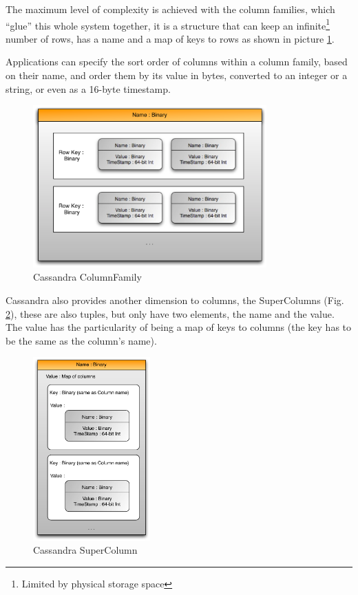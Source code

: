 The maximum level of complexity is achieved with the column families, which ``glue'' this whole system together, it is a structure that can keep an infinite\footnote{Limited by physical storage space} number of rows, has a name and a map of keys to rows as shown in picture \ref{fig:columnfamily}. 

Applications can specify the sort order of columns within a column family, based on their name, and order them by its value in bytes, converted to an integer or a string, or even as a 16-byte timestamp.

\begin{figure}[!htb]
  \begin{center}
    \leavevmode
    \includegraphics[width=0.8\textwidth]{images/columnfamily}
  \end{center}
  \caption{Cassandra ColumnFamily}
  \label{fig:columnfamily}
\end{figure}


Cassandra also provides another dimension to columns, the SuperColumns (Fig. \ref{fig:supercolumn}), these are also tuples, but only have two elements, the name and the value. The value has the particularity of being a map of keys to columns (the key has to be the same as the column's name).

\begin{figure}[htb]
  \begin{center}
    \leavevmode
    \includegraphics[width=0.4\textwidth]{images/supercolumn}
  \end{center}
  \caption{Cassandra SuperColumn}
  \label{fig:supercolumn}
\end{figure}

